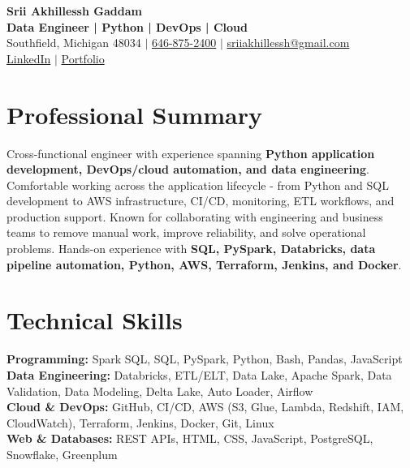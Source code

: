 \documentclass[letterpaper,10pt]{article}
\begin{document}
\fontsize{9.35pt}{10.45pt}\selectfont

\begin{center}
    {\LARGE \textbf{Srii Akhillessh Gaddam}} \\[-1pt]
    \textbf{Data Engineer | Python | DevOps | Cloud} \\[2pt]
    Southfield, Michigan 48034 $|$
    \href{tel:6468752400}{646-875-2400} $|$
    \href{mailto:sriiakhillessh@gmail.com}{sriiakhillessh@gmail.com} \\[1pt]
    \href{https://www.linkedin.com/in/srii-akhiilessh-gaddam-b48668191/}{LinkedIn} $|$
    \href{https://sriiakhillesshg.github.io/portfolio/}{Portfolio}
\end{center}
\vspace{-8pt}

\section{Professional Summary}
\small{Cross-functional engineer with experience spanning \textbf{Python application development, DevOps/cloud automation, and data engineering}. Comfortable working across the application lifecycle - from Python and SQL development to AWS infrastructure, CI/CD, monitoring, ETL workflows, and production support. Known for collaborating with engineering and business teams to remove manual work, improve reliability, and solve operational problems. Hands-on experience with \textbf{SQL, PySpark, Databricks, data pipeline automation, Python, AWS, Terraform, Jenkins, and Docker}.}

\section{Technical Skills}
\small{
\textbf{Programming:} Spark SQL, SQL, PySpark, Python, Bash, Pandas, JavaScript \\
\textbf{Data Engineering:} Databricks, ETL/ELT, Data Lake, Apache Spark, Data Validation, Data Modeling, Delta Lake, Auto Loader, Airflow \\
\textbf{Cloud \& DevOps:} GitHub, CI/CD, AWS (S3, Glue, Lambda, Redshift, IAM, CloudWatch), Terraform, Jenkins, Docker, Git, Linux \\
\textbf{Web \& Databases:} REST APIs, HTML, CSS, JavaScript, PostgreSQL, Snowflake, Greenplum
}
\end{document}
